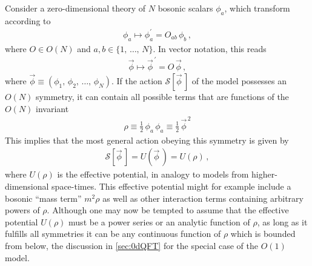 Consider a zero-dimensional theory of $N$ bosonic scalars $\phi_a$, which transform according to
\begin{align}
	\phi_a \mapsto \phi^\prime_a = O_{a b} \, \phi_b \, ,
\end{align}
where $O \in O(N)$ and $a, b \in \{ 1, \, \ldots , \, N \}$.
In vector notation, this reads
\begin{align}
	\vec{\phi} \mapsto \vec{\phi}^{\, \prime} = O \, \vec{\phi} \, ,
\end{align}
where $\vec{\phi} \equiv ( \phi_1 , \, \phi_2 , \, \ldots, \, \phi_N )$.
If the action $\mathcal{S} [ \vec{\phi} \, ]$ of the model possesses an $O(N)$ symmetry, it can contain all possible terms that are functions of the $O(N)$ invariant
\begin{align}
	\rho \equiv \tfrac{1}{2} \, \phi_a \, \phi_a \equiv \tfrac{1}{2} \, \vec{\phi}^{\, 2}	\label{eq:definition_so_3_invariant}
\end{align}
This implies that the most general action obeying this symmetry is given by
\begin{align}
	\mathcal{S}[ \vec{\phi} \, ] = U ( \vec{\phi} \, ) = U ( \rho ) \, ,
\end{align}
where $U ( \rho )$ is the effective potential, in analogy to models from higher-dimensional space-times.
This effective potential might for example include a bosonic ``mass term'' $m^2 \rho$ as well as other interaction terms containing arbitrary powers of $\rho$.
Although one may now be tempted to assume that the effective potential $U ( \rho )$ must be a power series or an analytic function of $\rho$, as long as it fulfills all symmetries it can be any continuous function of $\rho$ which is bounded from below, \cf{} the discussion in \cref{sec:0dQFT} for the special case of the $O ( 1 )$ model.


